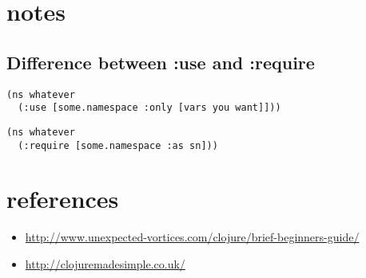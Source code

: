 \documentclass[11pt]{article}
\begin{document}
\section{notes}
\label{sec-9}
\subsection{Difference between :use and :require}
\label{sec-9-1}


\begin{verbatim}
(ns whatever
  (:use [some.namespace :only [vars you want]]))
\end{verbatim}


\begin{verbatim}
(ns whatever
  (:require [some.namespace :as sn]))
\end{verbatim}
\section{references}
\label{sec-10}

\begin{itemize}
\item \href{http://www.unexpected-vortices.com/clojure/brief-beginners-guide/}{http://www.unexpected-vortices.com/clojure/brief-beginners-guide/}
\item \href{http://clojuremadesimple.co.uk/}{http://clojuremadesimple.co.uk/}
\end{itemize}
\end{document}
